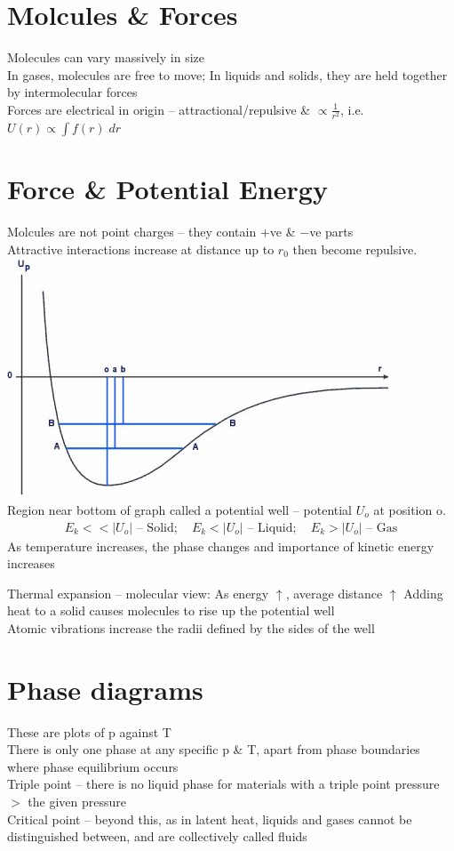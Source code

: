 \documentclass[a4paper, 11pt, fleqn, normalem]{report}
\begin{document}
\section{Molcules \& Forces}
Molecules can vary massively in size \\
In gases, molecules are free to move; In liquids and solids, they are held together by intermolecular forces \\
Forces are electrical in origin -- attractional/repulsive \& $\propto \frac{1}{r^{2}}$, i.e. $U(r)\propto\int\! f(r)\; dr$

\section{Force \& Potential Energy}
Molcules are not point charges -- they contain $+$ve \& $-$ve parts \\
Attractive interactions increase at distance up to $r_{0}$ then become repulsive. \\
\includegraphics[scale=0.9]{PotWell.jpg} \\
Region near bottom of graph called a potential well -- potential $U_{o}$ at position o.
\begin{align*}
	E_{k} << |U_{o}| \text{ -- Solid};\quad
	E_{k} < |U_{o}| \text{ -- Liquid};\quad
	E_{k} > |U_{o}| \text{ -- Gas}
\end{align*}
As temperature increases, the phase changes and importance of kinetic energy increases

Thermal expansion -- molecular view:
As energy $\uparrow$, average distance $\uparrow$
Adding heat to a solid causes molecules to rise up the potential well \\
Atomic vibrations increase the radii defined by the sides of the well

\section{Phase diagrams}
These are plots of p against T \\
There is only one phase at any specific p \& T, apart from phase boundaries where phase equilibrium occurs \\
Triple point -- there is no liquid phase for materials with a triple point pressure $>$ the given pressure \\
Critical point -- beyond this, as in latent heat, liquids and gases cannot be distinguished between, and are collectively called fluids
\end{document}
